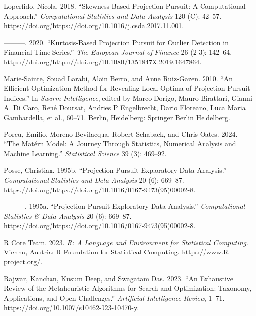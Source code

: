 \documentclass[
  12pt,
]{interact}
\newlength{\cslhangindent}
\newenvironment{CSLReferences}[2] %
 {\begin{list}{}{%
  \setlength{\itemindent}{0pt}
  \setlength{\leftmargin}{0pt}
  \setlength{\parsep}{0pt}
  \ifodd #1
   \setlength{\leftmargin}{\cslhangindent}
   \setlength{\itemindent}{-1\cslhangindent}
  \fi
  \setlength{\itemsep}{#2\baselineskip}}}
 {\end{list}}
\theoremstyle{plain}
\begin{document}
\begin{CSLReferences}{1}{0}
Loperfido, Nicola. 2018. {``Skewness-Based Projection Pursuit: A
Computational Approach.''} \emph{Computational Statistics and Data
Analysis} 120 (C): 42--57.
https://doi.org/\url{https://doi.org/10.1016/j.csda.2017.11.001}.

---------. 2020. {``Kurtosis-Based Projection Pursuit for Outlier
Detection in Financial Time Series.''} \emph{The European Journal of
Finance} 26 (2-3): 142--64.
https://doi.org/\url{https://doi.org/10.1080/1351847X.2019.1647864}.

Marie-Sainte, Souad Larabi, Alain Berro, and Anne Ruiz-Gazen. 2010.
{``An Efficient Optimization Method for Revealing Local Optima of
Projection Pursuit Indices.''} In \emph{Swarm Intelligence}, edited by
Marco Dorigo, Mauro Birattari, Gianni A. Di Caro, René Doursat, Andries
P Engelbrecht, Dario Floreano, Luca Maria Gambardella, et al., 60--71.
Berlin, Heidelberg: Springer Berlin Heidelberg.

Porcu, Emilio, Moreno Bevilacqua, Robert Schaback, and Chris Oates.
2024. {``The {M}atérn Model: A Journey Through Statistics, Numerical
Analysis and Machine Learning.''} \emph{Statistical Science} 39 (3):
469--92.

Posse, Christian. 1995b. {``Projection Pursuit Exploratory Data
Analysis.''} \emph{Computational Statistics and Data Analysis} 20 (6):
669--87.
https://doi.org/\url{https://doi.org/10.1016/0167-9473(95)00002-8}.

---------. 1995a. {``Projection Pursuit Exploratory Data Analysis.''}
\emph{Computational Statistics \& Data Analysis} 20 (6): 669--87.
https://doi.org/\url{https://doi.org/10.1016/0167-9473(95)00002-8}.

R Core Team. 2023. \emph{R: A Language and Environment for Statistical
Computing}. Vienna, Austria: R Foundation for Statistical Computing.
\url{https://www.R-project.org/}.

Rajwar, Kanchan, Kusum Deep, and Swagatam Das. 2023. {``An Exhaustive
Review of the Metaheuristic Algorithms for Search and Optimization:
Taxonomy, Applications, and Open Challenges.''} \emph{Artificial
Intelligence Review}, 1--71.
\url{https://doi.org/10.1007/s10462-023-10470-y}.


\end{CSLReferences}
\end{document}
